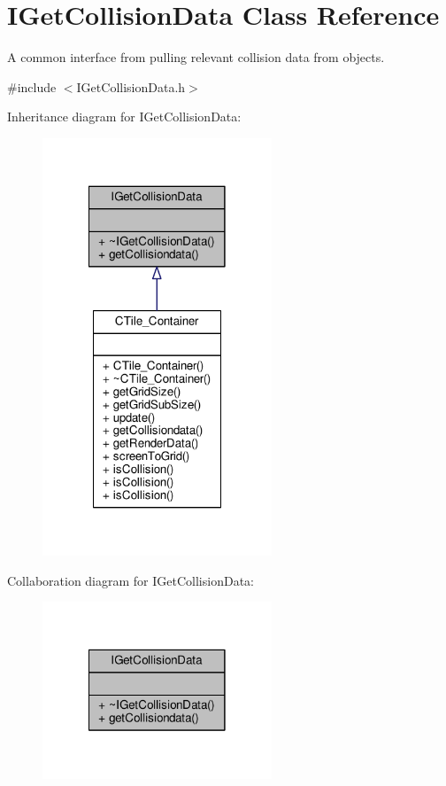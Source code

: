\hypertarget{classIGetCollisionData}{\section{I\-Get\-Collision\-Data Class Reference}
\label{classIGetCollisionData}
}


A common interface from pulling relevant collision data from objects.  




{\ttfamily \#include $<$I\-Get\-Collision\-Data.\-h$>$}



Inheritance diagram for I\-Get\-Collision\-Data\-:
\nopagebreak
\begin{figure}[H]
\begin{center}
\leavevmode
\includegraphics[width=194pt]{classIGetCollisionData__inherit__graph}
\end{center}
\end{figure}


Collaboration diagram for I\-Get\-Collision\-Data\-:\nopagebreak
\begin{figure}[H]
\begin{center}
\leavevmode
\includegraphics[width=194pt]{classIGetCollisionData__coll__graph}
\end{center}
\end{figure}
